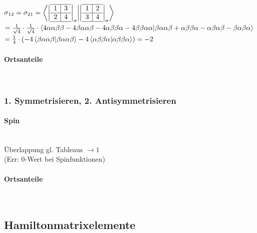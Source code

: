 \documentclass[12pt,a4paper]{article}
\begin{document}
  $\sigma_{12} = \sigma_{21} = \bra{\left|
  \begin{array}{c|c}
  \hline 
    1 & 3 \\ \hline 
    2 & 4 \\
    \hline 
  \end{array}
\right|_\sigma }  \ket{\left|
  \begin{array}{c|c}
  \hline 
    1 & 2 \\ \hline 
    3 & 4 \\
    \hline 
  \end{array}
 \right|_\sigma} $\\$=
 \frac{1}{\sqrt{4}} \cdot \frac{1}{\sqrt{4}}  \cdot 
 \bra{
 4\alpha\alpha\beta\beta- 4 \beta\alpha\alpha\beta- 4 \alpha\beta\beta\alpha - 4 \beta\beta\alpha\alpha
 }
 \ket{
 \beta\alpha\alpha\beta + \alpha\beta\beta\alpha- \alpha\beta\alpha\beta- \beta\alpha\beta\alpha
 }$ \\
 $ = \frac{1}{4} \cdot \left( -4 \bra{\beta\alpha\alpha\beta}\ket{\beta\alpha\alpha\beta} - 4 \bra{\alpha\beta\beta\alpha} \ket{\alpha\beta\beta\alpha}
 \right) = - 2
  $
 
 
  
 \paragraph{Ortsanteile}$ $ \\
 
 
 

 \subsubsection{1. Symmetrisieren, 2. Antisymmetrisieren}
 \paragraph{Spin}$ $ \\
 Überlappung gl. Tableaus $\rightarrow 1$ \\

(Err: 0-Wert bei Spinfunktionen) \\


 
 
 \paragraph{Ortsanteile}$ $ \\


 
 \subsection{Hamiltonmatrixelemente}
\end{document}
